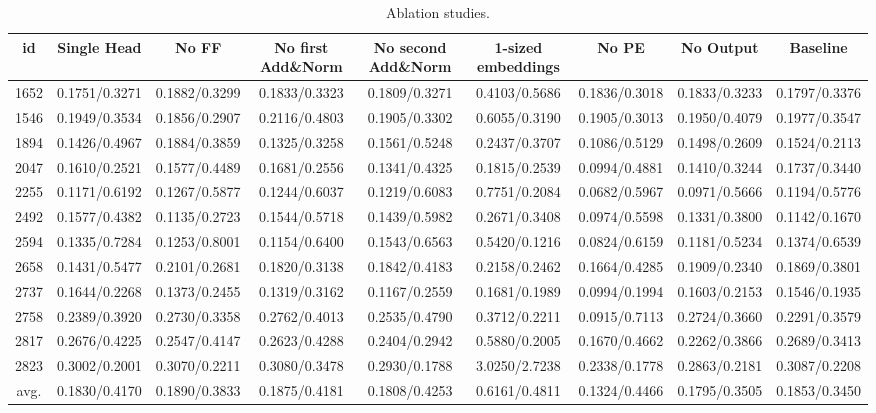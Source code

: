 \documentclass[algorithms,article,submit,pdftex,moreauthors]{Definitions/mdpi}
\begin{document}
\begin{table}[H]
	
	\caption{Ablation studies.}
	\label{tab:ablation}
	\centering
	\begin{tabular}{c | ccccccc | c}
		\toprule
		id & Single Head & No FF & No first Add\&Norm & No second Add\&Norm & 1-sized embeddings & No PE & No Output & Baseline \\
		\midrule
		1652 & 0.1751/0.3271 & 0.1882/0.3299 & 0.1833/0.3323 & 0.1809/0.3271 & 0.4103/0.5686 & 0.1836/0.3018 & 0.1833/0.3233 & 0.1797/0.3376   \\
		1546 & 0.1949/0.3534 & 0.1856/0.2907 & 0.2116/0.4803 & 0.1905/0.3302 & 0.6055/0.3190 & 0.1905/0.3013 & 0.1950/0.4079 & 0.1977/0.3547   \\
		1894 & 0.1426/0.4967 & 0.1884/0.3859 & 0.1325/0.3258 & 0.1561/0.5248 & 0.2437/0.3707 & 0.1086/0.5129 & 0.1498/0.2609 & 0.1524/0.2113   \\
		2047 & 0.1610/0.2521 & 0.1577/0.4489 & 0.1681/0.2556 & 0.1341/0.4325 & 0.1815/0.2539 & 0.0994/0.4881 & 0.1410/0.3244 & 0.1737/0.3440   \\
		2255 & 0.1171/0.6192 & 0.1267/0.5877 & 0.1244/0.6037 & 0.1219/0.6083 & 0.7751/0.2084 & 0.0682/0.5967 & 0.0971/0.5666 & 0.1194/0.5776  \\
		2492 & 0.1577/0.4382 & 0.1135/0.2723 & 0.1544/0.5718 & 0.1439/0.5982 & 0.2671/0.3408 & 0.0974/0.5598 & 0.1331/0.3800 & 0.1142/0.1670   \\
		2594 & 0.1335/0.7284 & 0.1253/0.8001 & 0.1154/0.6400 & 0.1543/0.6563 & 0.5420/0.1216 & 0.0824/0.6159 & 0.1181/0.5234 & 0.1374/0.6539   \\
		2658 & 0.1431/0.5477 & 0.2101/0.2681 & 0.1820/0.3138 & 0.1842/0.4183 & 0.2158/0.2462 & 0.1664/0.4285 & 0.1909/0.2340 & 0.1869/0.3801   \\
		2737 & 0.1644/0.2268 & 0.1373/0.2455 & 0.1319/0.3162 & 0.1167/0.2559 & 0.1681/0.1989 & 0.0994/0.1994 & 0.1603/0.2153 & 0.1546/0.1935  \\
		2758 & 0.2389/0.3920 & 0.2730/0.3358 & 0.2762/0.4013 & 0.2535/0.4790 & 0.3712/0.2211 & 0.0915/0.7113 & 0.2724/0.3660 & 0.2291/0.3579   \\
		2817 & 0.2676/0.4225 & 0.2547/0.4147 & 0.2623/0.4288 & 0.2404/0.2942 & 0.5880/0.2005 & 0.1670/0.4662 & 0.2262/0.3866 & 0.2689/0.3413   \\
		2823 & 0.3002/0.2001 & 0.3070/0.2211 & 0.3080/0.3478 & 0.2930/0.1788 & 3.0250/2.7238 & 0.2338/0.1778 & 0.2863/0.2181 & 0.3087/0.2208   \\
		avg. & 0.1830/0.4170 & 0.1890/0.3833 & 0.1875/0.4181 & 0.1808/0.4253 & 0.6161/0.4811 & 0.1324/0.4466 & 0.1795/0.3505 & 0.1853/0.3450	\\
		\bottomrule
	\end{tabular}
\end{table}
\end{document}
